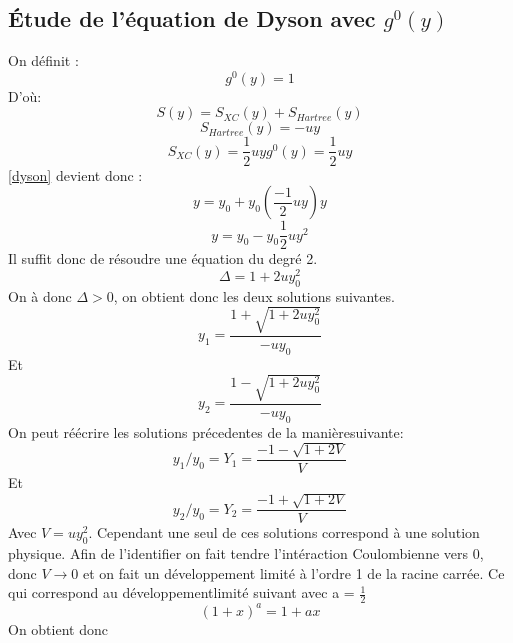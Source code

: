 \documentclass[12pt]{article}
\begin{document}
\subsection{\'Etude de l'\'equation de Dyson avec $g^0(y)$}
On d\'efinit :
\begin{equation}
 g^0(y) = 1
\end{equation}
D'o\`u:
\begin{equation}
 S(y) = S_{XC}(y) + S_{Hartree}(y)
\end{equation}
\begin{equation}
 S_{Hartree}(y) = -uy
\end{equation}
\begin{equation}
 S_{XC}(y) = \frac{1}{2} u y g^0(y) = \frac{1}{2} u y
\end{equation}
\ref{dyson} devient donc :
\begin{equation}
 y = y_0 + y_0 (\frac{-1}{2} u y) y
\end{equation}
\begin{equation}
 y = y_0 - y_0 \frac{1}{2} u y^2
\end{equation}
Il suffit donc de r\'esoudre une \'equation du degr\'e 2.
\begin{equation}
 \Delta = 1 + 2 u y_0^2
\end{equation}
On \`a donc $\Delta > 0 $, on obtient donc les deux solutions suivantes.
\begin{equation}
 y_1 = \frac{1 + \sqrt{1 + 2 u y_0 ^2}}{- u y_0}
\end{equation}
Et 
\begin{equation}
 y_2 = \frac{1 - \sqrt{1 + 2 u y_0^2}}{- u y_0}
\end{equation}
On peut r\'e\'ecrire les solutions pr\'ecedentes de la mani\`eresuivante:
\begin{equation}
 y_1/y_0 = Y_1 = \frac{-1-\sqrt{1 + 2 V}}{V}
\end{equation}
Et 
\begin{equation}
 y_2/y_0 = Y_2 = \frac{-1 + \sqrt{1 + 2V}}{V}
\end{equation}
Avec $V = uy_0^2$. Cependant une seul de ces solutions correspond \`a une solution physique. 
Afin de l'identifier on fait tendre l'int\'eraction Coulombienne vers 0, donc $V\rightarrow 0$ et on fait un d\'eveloppement limit\'e \`a l'ordre 1 de la racine carr\'ee. Ce qui correspond au d\'eveloppementlimit\'e suivant avec a = $\frac{1}{2}$
\begin{equation}
 (1 + x)^a = 1 + ax 
\end{equation}
On obtient donc 
\end{document}
